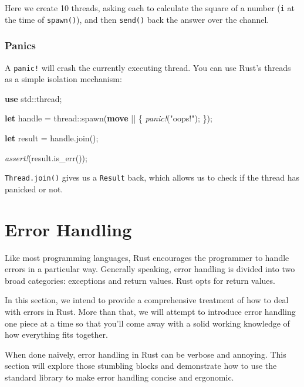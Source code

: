 \documentclass[a4paper,]{book}
\newenvironment{Shaded}{\begin{snugshade}}{\end{snugshade}}
\newcommand{\KeywordTok}[1]{\textcolor[rgb]{0.13,0.29,0.53}{\textbf{{#1}}}}
\newcommand{\StringTok}[1]{\textcolor[rgb]{0.31,0.60,0.02}{{#1}}}
\newcommand{\PreprocessorTok}[1]{\textcolor[rgb]{0.56,0.35,0.01}{\textit{{#1}}}}
\newcommand{\NormalTok}[1]{{#1}}
\begin{document}
Here we create 10 threads, asking each to calculate the square of a
number (\texttt{i} at the time of \texttt{spawn()}), and then
\texttt{send()} back the answer over the channel.

\subsubsection{Panics}\label{panics}

A \texttt{panic!} will crash the currently executing thread. You can use
Rust's threads as a simple isolation mechanism:

\begin{Shaded}
\begin{Highlighting}[]
\KeywordTok{use} \NormalTok{std::thread;}

\KeywordTok{let} \NormalTok{handle = thread::spawn(}\KeywordTok{move} \NormalTok{|| \{}
    \PreprocessorTok{panic!}\NormalTok{(}\StringTok{"oops!"}\NormalTok{);}
\NormalTok{\});}

\KeywordTok{let} \NormalTok{result = handle.join();}

\PreprocessorTok{assert!}\NormalTok{(result.is_err());}
\end{Highlighting}
\end{Shaded}

\texttt{Thread.join()} gives us a \texttt{Result} back, which allows us
to check if the thread has panicked or not.

\hypertarget{sec--error-handling}{\section{Error
Handling}\label{sec--error-handling}}

Like most programming languages, Rust encourages the programmer to
handle errors in a particular way. Generally speaking, error handling is
divided into two broad categories: exceptions and return values. Rust
opts for return values.

In this section, we intend to provide a comprehensive treatment of how
to deal with errors in Rust. More than that, we will attempt to
introduce error handling one piece at a time so that you'll come away
with a solid working knowledge of how everything fits together.

When done naïvely, error handling in Rust can be verbose and annoying.
This section will explore those stumbling blocks and demonstrate how to
use the standard library to make error handling concise and ergonomic.
\end{document}
